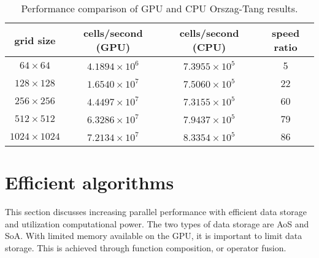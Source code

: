 \begin{table}[htbp]\figSpace
\caption{Performance comparison of GPU and CPU Orszag-Tang results.}
\begin{tabular*}{\textwidth}{@{\extracolsep{\fill}} cccc}
\\ 
\hline 
\hline 
grid size & cells/second (GPU) & cells/second (CPU) & speed ratio \\
\hline
$64\times64$ & $4.1894\times10^6$ & $7.3955\times10^5$ & 5 \\
$128\times128$ & $1.6540\times10^7$ & $7.5060\times10^5$ & 22 \\
$256\times256$ & $4.4497\times10^7$ & $7.3155\times10^5$ & 60 \\
$512\times512$ & $6.3286\times10^7$ & $7.9437\times10^5$ & 79 \\
$1024\times1024$ & $7.2134\times10^7$ & $8.3354\times10^5$ & 86 \\
\hline
\end{tabular*}
\figSpace
\end{table}


\section[Efficient algorithms]{Efficient algorithms}
\label{sec:efficient_algo}

This section discusses increasing parallel performance with efficient data storage and utilization computational power.  The two types of data storage are AoS and SoA.  With limited memory available on the GPU, it is important to limit data storage.  This is achieved through function composition, or operator fusion.


